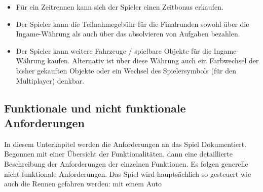 \begin{enumerate}
\begin{itemize}
			\item{Für ein Zeitrennen kann sich der Spieler einen Zeitbonus erkaufen.}
			\item{Der Spieler kann die Teilnahmegebühr für die Finalrunden sowohl über die Ingame-Währung als auch über das absolvieren von Aufgaben bezahlen.}
			\item{Der Spieler kann weitere Fahrzeuge / spielbare Objekte für die Ingame-Währung kaufen. Alternativ ist über diese Währung auch ein Farbwechsel der bisher gekauften Objekte oder ein Wechsel des Spielersymbols (für den Multiplayer) denkbar.}
		\end{itemize}
	\end{enumerate}

\subsection{Funktionale und nicht funktionale Anforderungen}
	In diesem Unterkapitel werden die Anforderungen an das Spiel Dokumentiert. Begonnen mit einer Übersicht der Funktionalitäten, dann eine detaillierte Beschreibung der Anforderungen der einzelnen Funktionen. Es folgen generelle nicht funktionale Anforderungen.
	Das Spiel wird hauptsächlich so gesteuert wie auch die Rennen gefahren werden: mit einem Auto

